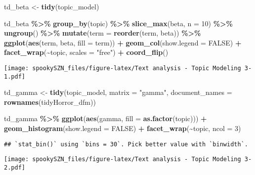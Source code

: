\documentclass[
]{article}
\newenvironment{Shaded}{\begin{snugshade}}{\end{snugshade}}
\newcommand{\AttributeTok}[1]{\textcolor[rgb]{0.13,0.29,0.53}{#1}}
\newcommand{\ConstantTok}[1]{\textcolor[rgb]{0.56,0.35,0.01}{#1}}
\newcommand{\DecValTok}[1]{\textcolor[rgb]{0.00,0.00,0.81}{#1}}
\newcommand{\FunctionTok}[1]{\textcolor[rgb]{0.13,0.29,0.53}{\textbf{#1}}}
\newcommand{\NormalTok}[1]{#1}
\newcommand{\OtherTok}[1]{\textcolor[rgb]{0.56,0.35,0.01}{#1}}
\newcommand{\SpecialCharTok}[1]{\textcolor[rgb]{0.81,0.36,0.00}{\textbf{#1}}}
\newcommand{\StringTok}[1]{\textcolor[rgb]{0.31,0.60,0.02}{#1}}
\begin{document}
\begin{Shaded}
\begin{Highlighting}[]
\NormalTok{td\_beta }\OtherTok{\textless{}{-}} \FunctionTok{tidy}\NormalTok{(topic\_model)}

\NormalTok{td\_beta }\SpecialCharTok{\%\textgreater{}\%} 
  \FunctionTok{group\_by}\NormalTok{(topic) }\SpecialCharTok{\%\textgreater{}\%} 
  \FunctionTok{slice\_max}\NormalTok{(beta, }\AttributeTok{n =} \DecValTok{10}\NormalTok{) }\SpecialCharTok{\%\textgreater{}\%} 
  \FunctionTok{ungroup}\NormalTok{() }\SpecialCharTok{\%\textgreater{}\%} 
  \FunctionTok{mutate}\NormalTok{(}\AttributeTok{term =} \FunctionTok{reorder}\NormalTok{(term, beta)) }\SpecialCharTok{\%\textgreater{}\%} 
  \FunctionTok{ggplot}\NormalTok{(}\FunctionTok{aes}\NormalTok{(term, beta, }\AttributeTok{fill =}\NormalTok{ term)) }\SpecialCharTok{+} 
  \FunctionTok{geom\_col}\NormalTok{(}\AttributeTok{show.legend =} \ConstantTok{FALSE}\NormalTok{) }\SpecialCharTok{+} 
  \FunctionTok{facet\_wrap}\NormalTok{(}\SpecialCharTok{\textasciitilde{}}\NormalTok{topic, }\AttributeTok{scales =} \StringTok{"free"}\NormalTok{) }\SpecialCharTok{+} 
  \FunctionTok{coord\_flip}\NormalTok{()}
\end{Highlighting}
\end{Shaded}

\texttt{[image: spookySZN\_files/figure-latex/Text analysis - Topic Modeling 3-1.pdf]}

\begin{Shaded}
\begin{Highlighting}[]
\NormalTok{td\_gamma }\OtherTok{\textless{}{-}} \FunctionTok{tidy}\NormalTok{(topic\_model, }\AttributeTok{matrix =} \StringTok{"gamma"}\NormalTok{, }
                 \AttributeTok{document\_names =} \FunctionTok{rownames}\NormalTok{(tidyHorror\_dfm))}

\NormalTok{td\_gamma }\SpecialCharTok{\%\textgreater{}\%} 
  \FunctionTok{ggplot}\NormalTok{(}\FunctionTok{aes}\NormalTok{(gamma, }\AttributeTok{fill =} \FunctionTok{as.factor}\NormalTok{(topic))) }\SpecialCharTok{+} 
           \FunctionTok{geom\_histogram}\NormalTok{(}\AttributeTok{show.legend =} \ConstantTok{FALSE}\NormalTok{) }\SpecialCharTok{+} 
           \FunctionTok{facet\_wrap}\NormalTok{(}\SpecialCharTok{\textasciitilde{}}\NormalTok{topic, }\AttributeTok{ncol =} \DecValTok{3}\NormalTok{)}
\end{Highlighting}
\end{Shaded}

\begin{verbatim}
## `stat_bin()` using `bins = 30`. Pick better value with `binwidth`.
\end{verbatim}

\texttt{[image: spookySZN\_files/figure-latex/Text analysis - Topic Modeling 3-2.pdf]}
\end{document}
